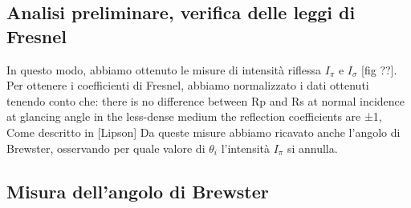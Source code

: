 \subsection{Analisi preliminare, verifica delle leggi di Fresnel}\label{subsec:analisi-dati}
  In questo modo, abbiamo ottenuto le misure di intensità riflessa $I_\pi$ e $I_\sigma$ [fig ??]. Per ottenere i
  coefficienti di Fresnel, abbiamo normalizzato i dati ottenuti tenendo conto che:
  there is no difference between Rp and Rs at normal incidence
  at glancing angle in the less-dense medium the reflection coefficients are ±1,
  Come descritto in [Lipson]
  Da queste misure abbiamo ricavato anche l’angolo di Brewster, osservando per quale valore di $\theta_i$
  l’intensità $I_\pi$ si annulla.
\subsection{Misura dell'angolo di Brewster}\label{subsec:angolo-di-brewster}
  \blindtext[2]
\endinput
